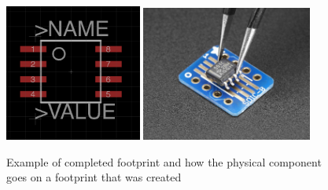 \documentclass{article}
\begin{document}
\begin{figure}[!h]
    \center
    \includegraphics[width=0.4\textwidth,height=0.4\textheight,keepaspectratio]{package1}
    \includegraphics[width=0.5\textwidth,height=0.5\textheight,keepaspectratio]{package2}
    \caption {Example of completed footprint and how the physical component goes on a footprint that was created}
    \label{img:package1}
\end{figure}
\end{document}
